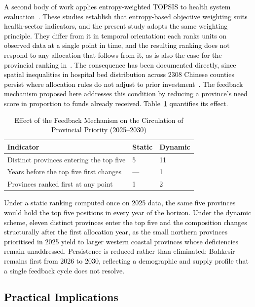 \documentclass[final, 9pt, twocolumn]{saucis}
\newcommand{\rev}[1]{\textcolor{black}{#1}}
\begin{document}
\rev{A second body of work applies entropy-weighted TOPSIS to health system
evaluation~\cite{lit1,lit2,lit3,lit4,lit5,lit6}. These studies establish that
entropy-based objective weighting suits health-sector indicators, and the
present study adopts the same weighting principle. They differ from it in
temporal orientation: each ranks units on observed data at a single point in
time, and the resulting ranking does not respond to any allocation that follows
from it, as is also the case for the provincial ranking in~\cite{intro10}. The
consequence has been documented directly, since spatial inequalities in hospital
bed distribution across 2308 Chinese counties persist where allocation rules do
not adjust to prior investment~\cite{lit7}. The feedback mechanism proposed here
addresses this condition by reducing a province's need score in proportion to
funds already received. Table~\ref{tab:static_dynamic} quantifies its effect.}

\begin{table}[htbp]
\centering
\caption{\rev{Effect of the Feedback Mechanism on the Circulation of Provincial Priority (2025--2030)}}
\label{tab:static_dynamic}
\small
\begin{tabular}{p{3.6cm} p{1.4cm} p{1.6cm}}
\hline
\textbf{Indicator} & \textbf{Static} & \textbf{Dynamic} \\
\hline
Distinct provinces entering the top five & 5 & 11 \\
Years before the top five first changes & --- & 1 \\
Provinces ranked first at any point & 1 & 2 \\
\hline
\end{tabular}
\end{table}

\rev{Under a static ranking computed once on 2025 data, the same five provinces
would hold the top five positions in every year of the horizon. Under the
dynamic scheme, eleven distinct provinces enter the top five and the composition
changes structurally after the first allocation year, as the small northern
provinces prioritised in 2025 yield to larger western coastal provinces whose
deficiencies remain unaddressed. Persistence is reduced rather than eliminated:
Balıkesir remains first from 2026 to 2030, reflecting a demographic and supply
profile that a single feedback cycle does not resolve.}

\subsection{\rev{Practical Implications}}
\end{document}
